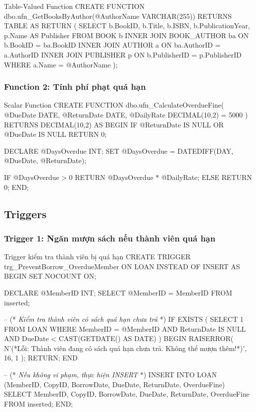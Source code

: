 \documentclass[12pt,a4paper]{article}
\newcommand{\vncomment}[1]{\textit{\color{green!50!black}#1}}
\begin{document}
\begin{sqlcode}{Table-Valued Function}
CREATE FUNCTION dbo.ufn_GetBooksByAuthor(@AuthorName VARCHAR(255))
RETURNS TABLE
AS
RETURN
(
    SELECT b.BookID, b.Title, b.ISBN, b.PublicationYear, p.Name AS Publisher
    FROM BOOK b
    INNER JOIN BOOK_AUTHOR ba ON b.BookID = ba.BookID
    INNER JOIN AUTHOR a ON ba.AuthorID = a.AuthorID
    INNER JOIN PUBLISHER p ON b.PublisherID = p.PublisherID
    WHERE a.Name = @AuthorName
);
\end{sqlcode}

\subsubsection{Function 2: Tính phí phạt quá hạn}

\begin{sqlcode}{Scalar Function}
CREATE FUNCTION dbo.ufn_CalculateOverdueFine(
    @DueDate DATE,
    @ReturnDate DATE,
    @DailyRate DECIMAL(10,2) = 5000
)
RETURNS DECIMAL(10,2)
AS
BEGIN
    IF @ReturnDate IS NULL OR @DueDate IS NULL
        RETURN 0;

    DECLARE @DaysOverdue INT;
    SET @DaysOverdue = DATEDIFF(DAY, @DueDate, @ReturnDate);

    IF @DaysOverdue > 0
        RETURN @DaysOverdue * @DailyRate;
    ELSE
        RETURN 0;
END;
\end{sqlcode}

\subsection{Triggers}

\subsubsection{Trigger 1: Ngăn mượn sách nếu thành viên quá hạn}

\begin{sqlcode}{Trigger kiểm tra thành viên bị quá hạn}
CREATE TRIGGER trg_PreventBorrow_OverdueMember
ON LOAN
INSTEAD OF INSERT
AS
BEGIN
    SET NOCOUNT ON;

    DECLARE @MemberID INT;
    SELECT @MemberID = MemberID FROM inserted;

    -- (* \vncomment{Kiểm tra thành viên có sách quá hạn chưa trả} *)
    IF EXISTS (
        SELECT 1 FROM LOAN
        WHERE MemberID = @MemberID
          AND ReturnDate IS NULL
          AND DueDate < CAST(GETDATE() AS DATE)
    )
    BEGIN
        RAISERROR(
            N'(*Lỗi: Thành viên đang có sách quá hạn chưa trả. Không thể mượn thêm!*)',
            16, 1
        );
        RETURN;
    END

    -- (* \vncomment{Nếu không vi phạm, thực hiện INSERT} *)
    INSERT INTO LOAN (MemberID, CopyID, BorrowDate, DueDate, ReturnDate, OverdueFine)
    SELECT MemberID, CopyID, BorrowDate, DueDate, ReturnDate, OverdueFine
    FROM inserted;
END;
\end{sqlcode}
\end{document}
